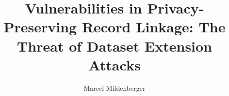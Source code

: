 




\author{Marcel Mildenberger}


\title{Vulnerabilities in Privacy-Preserving Record Linkage: The Threat of Dataset Extension Attacks}





